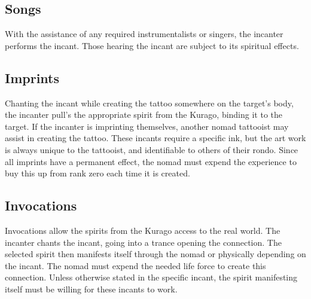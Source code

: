 \subsection{Songs}

With the assistance of any required instrumentalists or singers, the incanter performs the incant. Those hearing the incant are subject to its spiritual effects.

\subsection{Imprints}

Chanting the incant while creating the tattoo somewhere on the target's body, the incanter pull's the  appropriate spirit from the Kurago, binding it to the target. If the incanter is imprinting themselves, another nomad tattooist may assist in creating the tattoo. These incants require a specific ink, but the art work is always unique to the tattooist, and identifiable to others of their rondo. Since all imprints have a permanent effect, the nomad must expend the experience to buy this up from rank zero each time it is created.

\subsection{Invocations}

Invocations allow the spirits from the Kurago access to the real world. The incanter chants the incant, going into a trance opening the connection. The selected spirit then manifests itself through the nomad or physically depending on the incant. The nomad must expend the needed life force to create this connection. Unless otherwise stated in the specific incant, the spirit manifesting itself must be willing for these incants to work.



